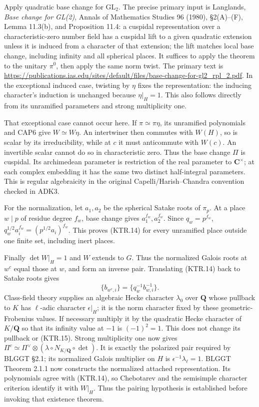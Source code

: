 \documentclass[11pt,a4paper]{article}
\numberwithin{equation}{section}
\theoremstyle{remark}\newtheorem{remark}[theorem]{Remark}
\begin{document}
Apply quadratic base change for \(\mathrm{GL}_2\).
The precise primary input is Langlands, \emph{Base change for
GL(2)}, Annals of Mathematics Studies 96 (1980),
\S2(A)--(F), Lemma 11.3(b), and Proposition 11.4:
a cuspidal representation over a characteristic-zero number
field has a cuspidal lift to a given quadratic extension unless
it is induced from a character of that extension; the lift
matches local base change, including infinity and all spherical
places.  It suffices to apply the theorem to the unitary
\(\pi^0\), then apply the same norm twist.
The primary text is
\url{https://publications.ias.edu/sites/default/files/base-change-for-gl2_rpl_2.pdf}.
In the exceptional induced case, twisting by \(\eta\) fixes
the representation: the inducing character's induction is
unchanged because \(\eta|_H=1\).  This also follows directly
from its unramified parameters and strong multiplicity one.

That exceptional case cannot occur here.  If
\(\pi\simeq\pi\eta\), its unramified polynomials and
CAP6 give \(W\simeq W\eta\).  An intertwiner then commutes
with \(W(H)\), so is scalar by its irreducibility, while at
\(c\) it must anticommute with \(W(c)\).  An invertible
scalar cannot do so in characteristic zero.  Thus the base change
\(\Pi\) is cuspidal.  Its archimedean parameter is restriction
of the real parameter to \(\mathbf C^\times\); at each
complex embedding it has the same two distinct half-integral
parameters.  This is regular algebraicity in the original
Capelli/Harish--Chandra convention checked in ADK3.

For the normalization, let \(a_1,a_2\) be the spherical Satake
roots of \(\pi_p\).  At a place \(w\mid p\) of residue
degree \(f_w\), base change gives \(a_1^{f_w},a_2^{f_w}\).
Since \(q_w=p^{f_w}\),
\(q_w^{1/2}a_i^{f_w}=(p^{1/2}a_i)^{f_w}\).
This proves (KTR.14) for every unramified place outside one
finite set, including inert places.

Finally \(\det W|_H=1\) and \(W\) extends to \(G\).
Thus the normalized Galois roots at \(w^c\) equal those at
\(w\), and form an inverse pair.  Translating (KTR.14) back
to Satake roots gives
\[
 \{b_{w^c,i}\}=\{q_w^{-1}b_{w,i}^{-1}\}.
 \tag{KTR.15}
\]
Class-field theory supplies an algebraic Hecke character
\(\lambda_0\) over \(\mathbf Q\) whose pullback to \(K\)
has \(\ell\)-adic character \(\epsilon|_H\); it is the
norm character fixed by these geometric-Frobenius values.
If necessary multiply it by the quadratic Hecke character of
\(K/\mathbf Q\) so that its infinity value at \(-1\) is
\((-1)^2=1\).  This does not change its pullback or (KTR.15).
Strong multiplicity one now gives
\(\Pi^c\simeq\Pi^\vee\otimes(\lambda\circ N_{K/\mathbf Q}\circ\det)\).
It is exactly the polarized pair required by BLGGT \S2.1;
its normalized Galois multiplier on \(H\) is
\(\epsilon^{-1}\lambda_\ell=1\).
BLGGT Theorem 2.1.1 now constructs the normalized attached
representation.  Its polynomials agree with (KTR.14), so
Chebotarev and the semisimple character criterion identify it
with \(W|_H\).  Thus the pairing hypothesis is established
before invoking that existence theorem.
\end{document}
